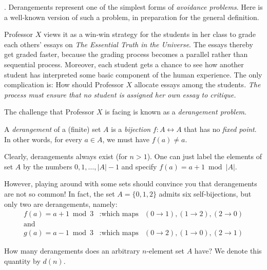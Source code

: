 \bigskip

 

.
Derangements represent one of the simplest forms of {\em avoidance problems}.  Here is a
well-known version of such a problem, in preparation for the general definition.

\smallskip

Professor $X$ views it as a win-win strategy for the students in her class to grade each others' essays on {\it The Essential Truth in the Universe}.  The essays thereby get graded faster, because the grading process becomes a parallel rather than sequential process.  Moreover, each student gets a chance to see how another student has interpreted some basic component of the human experience.  The only complication is: How should Professor $X$  allocate essays among the students.  {\em The process must ensure that no student is assigned her own essay to critique.}

\smallskip

The challenge that Professor $X$ is facing is known as a {\em derangement problem}.

\bigskip

\noindent 
A {\em derangement} of a (finite) set $A$ is a {\em bijection} $f: A \leftrightarrow A$ that has no 
{\em fixed point}.  In other words, for every $a \in A$, we must have $f(a) \neq a$.

\medskip

Clearly, derangements always exist (for $n>1$).  One can just label the elements of set $A$ by the numbers $0, 1, \ldots, |A|-1$ and specify $f(a) = a+1 \bmod |A|$.

\medskip

However, playing around with some sets should convince you that derangements are not so common!  In fact, the set  $A = \{0, 1,2 \}$ admits six self-bijections, but only two are derangements, namely:
\[
\begin{array}{lll}
f(a) = a+1 \bmod 3 &: \mbox{which maps} &(0 \rightarrow 1),  (1 \rightarrow 2), (2 \rightarrow 0) \\
\mbox{and} &  & \\
g(a) = a-1 \bmod 3 &: \mbox{which maps} & (0 \rightarrow 2),  (1 \rightarrow 0), (2 \rightarrow 1)
\end{array}
\]

\medskip

How many derangements does an arbitrary $n$-element set $A$ have?   We denote this quantity by $d(n)$.

